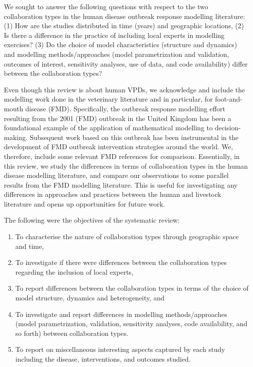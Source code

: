 \documentclass[10pt,letterpaper]{article}
\begin{document}
We sought to answer the following questions with respect to the two collaboration types in the human disease outbreak response modelling literature: (1) How are the studies distributed in time (years) and geographic locations, (2) Is there a difference in the practice of including local experts in modelling exercises? (3) Do the choice of model characteristics (structure and dynamics) and modelling methods/approaches (model parametrization and validation, outcomes of interest, sensitivity analyses, use of data, and code availability) differ between the collaboration types?    

Even though this review is about human VPDs, we acknowledge and include the modelling work done in the veterinary literature and in particular, for foot-and-mouth disease (FMD). Specifically, the outbreak response modelling effort resulting from the 2001 (FMD) outbreak in the United Kingdom has been a foundational example of the application of mathematical modelling to decision-making. Subsequent work based on this outbreak has been instrumental in the development of FMD outbreak intervention strategies around the world. We, therefore, include some relevant FMD references for comparison. Essentially, in this review, we study the differences in terms of collaboration types in the human disease modelling literature, and compare our observations to some parallel results from the FMD modelling literature. This is useful for investigating any differences in approaches and practices between the human and livestock literature and opens up opportunities for future work. 

The following were the objectives of the systematic review:
\begin{enumerate}
	\item To characterise the nature of collaboration types through geographic space and time,
	\item To investigate if there were differences between the collaboration types regarding the inclusion of local experts,
	\item To report differences between the collaboration types in terms of the choice of model structure, dynamics and heterogeneity, and
	\item To investigate and report differences in modelling methods/approaches (model parametrization, validation, sensitivity analyses, code availability, and so forth) between collaboration types.
	\item To report on miscellaneous interesting aspects captured by each study including the disease, interventions, and outcomes studied.
\end{enumerate}
\end{document}
